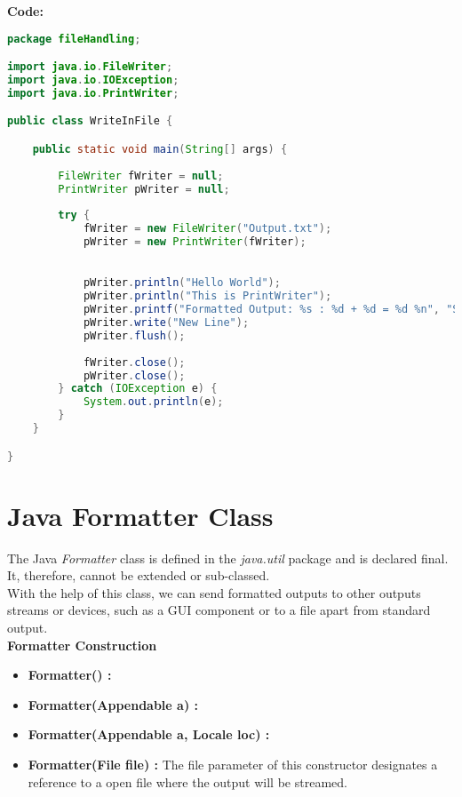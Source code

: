 \textbf{Code:}
\begin{lstlisting}[language=java]
package fileHandling;

import java.io.FileWriter;
import java.io.IOException;
import java.io.PrintWriter;

public class WriteInFile {

	public static void main(String[] args) {
		
		FileWriter fWriter = null;
		PrintWriter pWriter = null;
		
		try {
			fWriter = new FileWriter("Output.txt");
			pWriter = new PrintWriter(fWriter);
			

			pWriter.println("Hello World");
			pWriter.println("This is PrintWriter");
			pWriter.printf("Formatted Output: %s : %d + %d = %d %n", "Sum",5,7,12);
			pWriter.write("New Line");
			pWriter.flush();
			
			fWriter.close();
			pWriter.close();
		} catch (IOException e) {
			System.out.println(e);
		}
	}

}

\end{lstlisting}


\newpage
\section{Java Formatter Class}
The Java \textit{Formatter} class is defined in the \textit{java.util} package and is declared final. It, therefore, cannot be extended or sub-classed.\\
With the help of this class, we can send formatted outputs to other outputs streams or devices, such as a GUI component or to a file apart from standard output.\\
\textbf{Formatter Construction}
\begin{itemize}
	\item \textbf{Formatter() :}
	\item \textbf{Formatter(Appendable a) :}
	\item \textbf{Formatter(Appendable a, Locale loc) :}
	\item \textbf{Formatter(File file) :} The file parameter of this constructor designates a reference to a open file where the output will be streamed.\\
\end{itemize}

